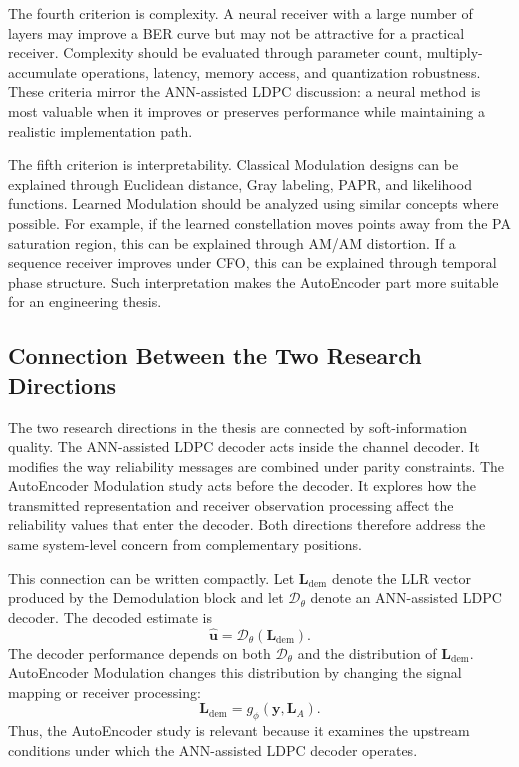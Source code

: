 The fourth criterion is complexity. A neural receiver with a large number of layers may improve a BER curve but may not be attractive for a practical receiver. Complexity should be evaluated through parameter count, multiply-accumulate operations, latency, memory access, and quantization robustness. These criteria mirror the ANN-assisted LDPC discussion: a neural method is most valuable when it improves or preserves performance while maintaining a realistic implementation path.

The fifth criterion is interpretability. Classical Modulation designs can be explained through Euclidean distance, Gray labeling, PAPR, and likelihood functions. Learned Modulation should be analyzed using similar concepts where possible. For example, if the learned constellation moves points away from the PA saturation region, this can be explained through AM/AM distortion. If a sequence receiver improves under CFO, this can be explained through temporal phase structure. Such interpretation makes the AutoEncoder part more suitable for an engineering thesis.

\subsection{Connection Between the Two Research Directions}
The two research directions in the thesis are connected by soft-information quality. The ANN-assisted LDPC decoder acts inside the channel decoder. It modifies the way reliability messages are combined under parity constraints. The AutoEncoder Modulation study acts before the decoder. It explores how the transmitted representation and receiver observation processing affect the reliability values that enter the decoder. Both directions therefore address the same system-level concern from complementary positions.

This connection can be written compactly. Let $\mathbf{L}_{\mathrm{dem}}$ denote the LLR vector produced by the Demodulation block and let $\mathcal{D}_\theta$ denote an ANN-assisted LDPC decoder. The decoded estimate is
\begin{equation}
  \hat{\mathbf{u}}=\mathcal{D}_\theta(\mathbf{L}_{\mathrm{dem}}).
\end{equation}
The decoder performance depends on both $\mathcal{D}_\theta$ and the distribution of $\mathbf{L}_{\mathrm{dem}}$. AutoEncoder Modulation changes this distribution by changing the signal mapping or receiver processing:
\begin{equation}
  \mathbf{L}_{\mathrm{dem}}=g_\phi(\mathbf{y},\mathbf{L}_A).
\end{equation}
Thus, the AutoEncoder study is relevant because it examines the upstream conditions under which the ANN-assisted LDPC decoder operates.

